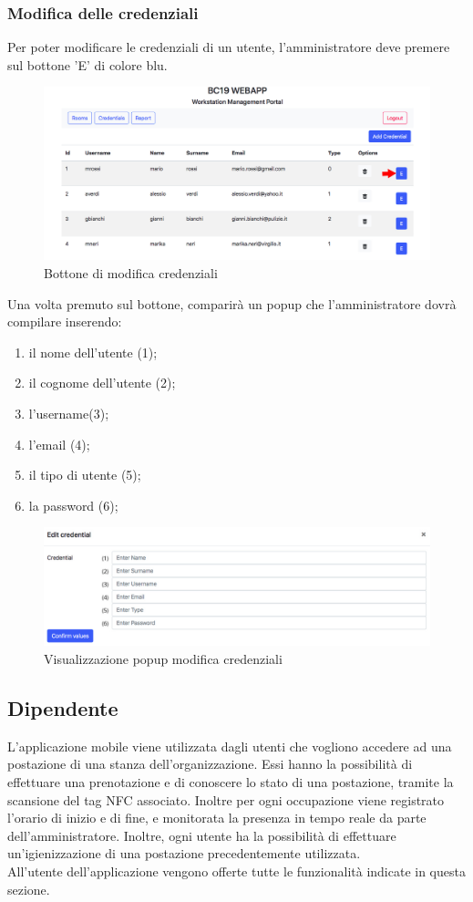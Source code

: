 \subsubsection{Modifica delle credenziali}
Per poter modificare le credenziali di un utente, l'amministratore deve premere sul bottone 'E' di colore blu.
\begin{figure}[H]
	\centering
	\includegraphics[width=15cm]{res/images/optionEdit.jpg}
	\caption{Bottone di modifica credenziali}
\end{figure}
Una volta premuto sul bottone, comparirà un popup che l'amministratore dovrà compilare inserendo:
\begin{enumerate}
\item il nome dell'utente (1);
\item il cognome dell'utente (2);
\item l'username(3);
\item l'email (4);
\item il tipo di utente (5);
\item la password (6);
\end{enumerate}
\begin{figure}[H]
	\centering
	\includegraphics[width=15cm]{res/images/editc.jpg}
	\caption{Visualizzazione popup modifica credenziali}
\end{figure}


\subsection{Dipendente}
L'applicazione mobile viene utilizzata dagli utenti che vogliono accedere ad una postazione di una stanza dell'organizzazione. Essi hanno la possibilità di effettuare una prenotazione e di conoscere lo stato di una postazione, tramite la scansione del tag NFC associato. Inoltre per ogni occupazione viene registrato l'orario di inizio e di fine, e monitorata la presenza in tempo reale da parte dell'amministratore. Inoltre, ogni utente ha la possibilità di effettuare un'igienizzazione di una postazione precedentemente utilizzata. 
\\All'utente dell'applicazione vengono offerte tutte le funzionalità indicate in questa sezione.
